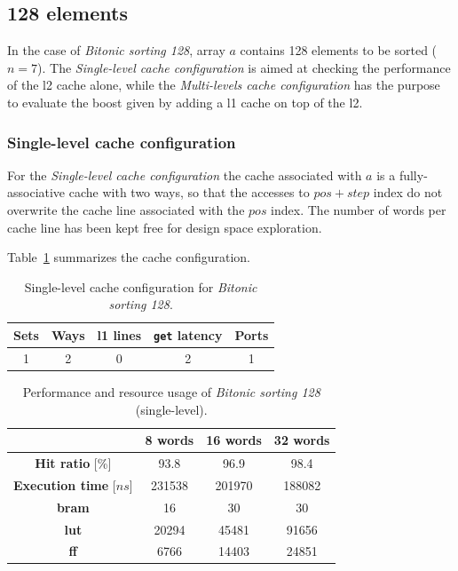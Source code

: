 \documentclass[11pt,a4paper,oneside]{memoir}
\begin{document}
\subsection{128 elements}
In the case of \emph{Bitonic sorting 128}, array $a$ contains 128 elements to be
sorted ($n = 7$).
The \emph{Single-level cache configuration} is aimed at checking the performance
of the \ac{l2} cache alone, while the \emph{Multi-levels cache configuration}
has the purpose to evaluate the boost given by adding a \ac{l1} cache on top of
the \ac{l2}.

\subsubsection{Single-level cache configuration}
For the \emph{Single-level cache configuration} the cache associated with $a$ is
a fully-associative cache with two ways, so that the accesses to $pos + step$
index do not overwrite the cache line associated with the $pos$ index.
The number of words per cache line has been kept free for design space
exploration.

Table~\ref{tab:bitonic_128_no_l1_config} summarizes the cache configuration.

\begin{table}[H]
	\begin{center}
		\begin{tabular}{ccccc}
			\hline
			\rowcolor{gray!50}
			\textbf{Sets} & \textbf{Ways} & \textbf{\ac{l1} lines} &
			\textbf{\texttt{get} latency} & \textbf{Ports} \\
			\hline
			1 & 2 & 0 & 2 & 1 \\
			\hline
		\end{tabular}
	\end{center}
	\caption{Single-level cache configuration for \emph{Bitonic sorting 128}.}
	\label{tab:bitonic_128_no_l1_config}
\end{table}

\begin{table}[H]
	\begin{center}
		\begin{tabular}{cccc}
			\hline
			\rowcolor{gray!50}
			& \textbf{8 words} & \textbf{16 words} & \textbf{32 words} \\
			\hline
			\textbf{Hit ratio} [\%] & 93.8 & 96.9 & 98.4 \\
			\rowcolor{gray!25}
			\textbf{Execution time} [$ns$] & 231538 & 201970 & 188082 \\
			\textbf{\ac{bram}} & 16 & 30 & 30 \\
			\rowcolor{gray!25}
			\textbf{\acs{lut}} & 20294 & 45481 & 91656 \\
			\textbf{\acs{ff}} & 6766 & 14403 & 24851 \\
			\hline
		\end{tabular}
	\end{center}
	\caption{Performance and resource usage of \emph{Bitonic sorting 128} (single-level).}
	\label{tab:bitonic_128_no_l1_report}
\end{table}
\end{document}

